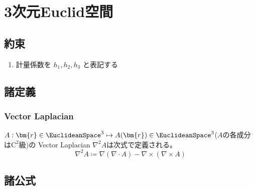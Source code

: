 \chapter{3次元Euclid空間}
    \section{約束}
        \begin{enumerate}
            \item 計量係数を $h_1,h_2,h_3$ と表記する
        \end{enumerate}
    \section{諸定義}
        \subsection{Vector Laplacian}
            \label{VectorLaplacian}
            \begin{definition}
                $A:\bm{r}\in\EuclideanSpace^3 \mapsto A(\bm{r}) \in \EuclideanSpace^3$($A$の各成分は$\mathrm{C}^2$級)の Vector Laplacian $\nabla^2 A$は次式で定義される。
                \[ \nabla^2A \coloneq \nabla(\nabla\cdot A) - \nabla\times(\nabla\times A) \]
            \end{definition}
    \section{諸公式}
